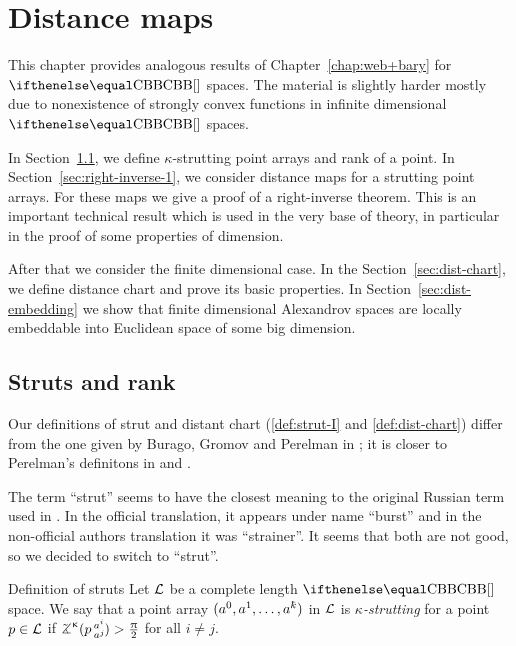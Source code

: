 \chapter{Distance maps %
}\label{chap:dist-maps}

This chapter provides analogous results of Chapter~\ref{chap:web+bary} for $\Alex{}$ spaces.
The material is slightly harder mostly due to nonexistence of strongly convex functions in infinite dimensional $\Alex{}$ spaces.

In Section~\ref{sec:struts+rank},
we define $\kappa$-strutting point arrays 
and rank of a point.
In Section~\ref{sec:right-inverse-1},
we consider distance maps for a strutting point arrays.
For these maps we give a proof of a right-inverse theorem.
This is an important technical result which is used in the very base of theory, in particular in the proof of some properties of dimension.

After that we consider the finite dimensional case.
In the Section~\ref{sec:dist-chart}, we define distance chart and prove its basic properties.
In Section~\ref{sec:dist-embedding} we show that finite dimensional Alexandrov spaces are locally embeddable into Euclidean space of some big dimension.



\section{Struts and rank}\label{sec:struts+rank}

Our definitions of strut 
and distant chart 
(\ref{def:strut-I} and \ref{def:dist-chart}) 
differ from the one 
given by 
Burago, 
Gromov 
and Perelman in \cite{BGP};
it is closer to Perelman's definitons in \cite{perelman:spaces2} %
and \cite{perelman:morse}%
.

The term ``strut'' seems to have the closest meaning to the original Russian term used in \cite{BGP}.
In the official translation,
it appears under name ``burst'' 
and in the non-official authors translation it was ``strainer''.
It seems that both are not good, 
so we decided to switch to ``strut''.

\begin{thm}{Definition of struts}\label{def:strut-I}
Let $\mathcal{L}$ be a complete length $\Alex{}$ space.
We say that a point array $(a^0,a^1,\dots,a^\kay)$ in $\mathcal{L}$
 is \emph{$\kappa$-strutting} for a point $p\in\spc{L}$ if $\angk\kappa p {a^i}{a^j}>\tfrac\pi2$ for all $i\not=j$.
\end{thm} 



